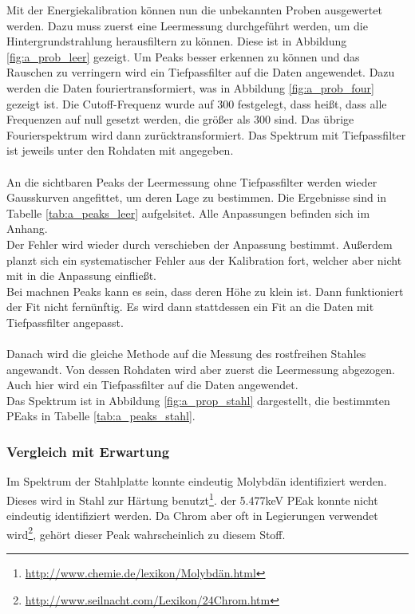 \documentclass[12pt,a4paper]{article}
\begin{document}
Mit der Energiekalibration können nun die unbekannten Proben ausgewertet werden. Dazu muss zuerst eine Leermessung durchgeführt werden, um die Hintergrundstrahlung herausfiltern zu können. Diese ist in Abbildung \ref{fig:a_prob_leer} gezeigt. Um Peaks besser erkennen zu können und das Rauschen zu verringern wird ein Tiefpassfilter auf die Daten angewendet. Dazu werden die Daten fouriertransformiert, was in Abbildung \ref{fig:a_prob_four} gezeigt ist. Die Cutoff-Frequenz wurde auf 300 festgelegt, dass heißt, dass alle Frequenzen auf null gesetzt werden, die größer als 300 sind. Das übrige Fourierspektrum wird dann zurücktransformiert. Das Spektrum mit Tiefpassfilter ist jeweils unter den Rohdaten mit angegeben.\\
\\
An die sichtbaren Peaks der Leermessung ohne Tiefpassfilter werden wieder Gausskurven angefittet, um deren Lage zu bestimmen. Die Ergebnisse sind in Tabelle \ref{tab:a_peaks_leer} aufgelsitet. Alle Anpassungen befinden sich im Anhang.\\
Der Fehler wird wieder durch verschieben der Anpassung bestimmt. Außerdem planzt sich ein systematischer Fehler aus der Kalibration fort, welcher aber nicht mit in die Anpassung einfließt.\\
Bei machnen Peaks kann es sein, dass deren Höhe zu klein ist. Dann funktioniert der Fit nicht fernünftig. Es wird dann stattdessen ein Fit an die Daten mit Tiefpassfilter angepasst.\\
\\
Danach wird die gleiche Methode auf die Messung des rostfreihen Stahles angewandt. 
Von dessen Rohdaten wird aber zuerst die Leermessung abgezogen. 
Auch hier wird ein Tiefpassfilter auf die Daten angewendet.\\
Das Spektrum ist in Abbildung \ref{fig:a_prop_stahl} dargestellt, die bestimmten PEaks in Tabelle \ref{tab:a_peaks_stahl}.

\subsubsection{Vergleich mit Erwartung}
Im Spektrum der Stahlplatte konnte eindeutig Molybdän identifiziert werden. Dieses wird in Stahl zur Härtung benutzt\footnote{\url{http://www.chemie.de/lexikon/Molybdän.html}}. der 5.477keV PEak konnte nicht eindeutig identifiziert werden. Da Chrom aber oft in Legierungen verwendet wird\footnote{\url{http://www.seilnacht.com/Lexikon/24Chrom.htm}}, gehört dieser Peak wahrscheinlich zu diesem Stoff.
\end{document}
